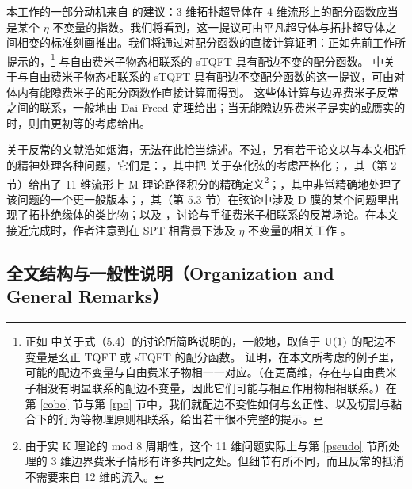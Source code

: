 本工作的一部分动机来自 \cite{KTTW} 的建议：3 维拓扑超导体在 4 维流形上的配分函数应当是某个 $\eta$ 不变量的指数。我们将看到，这一提议可由平凡超导体与拓扑超导体之间相变的标准刻画推出。我们将通过对配分函数的直接计算证明：正如先前工作所提示的，\footnote{正如 \cite{Freed} 中关于式（5.4）的讨论所简略说明的，一般地，取值于 ${\mathrm U}(1)$ 的配边不变量是幺正 TQFT 或 sTQFT 的配分函数。\cite{KTTW} 证明，在本文所考虑的例子里，可能的配边不变量与自由费米子物相一一对应。（在更高维，存在与自由费米子相没有明显联系的配边不变量，因此它们可能与相互作用物相相联系。）在第 \ref{cobo} 节与第 \ref{rpo} 节中，我们就配边不变性如何与幺正性、以及切割与黏合下的行为等物理原则相联系，给出若干很不完整的提示。} 与自由费米子物态相联系的 sTQFT 具有配边不变的配分函数。
\cite{KTTW} 中关于与自由费米子物态相联系的 sTQFT 具有配边不变配分函数的这一提议，可由对体内有能隙费米子的配分函数作直接计算而得到。
这些体计算与边界费米子反常之间的联系，一般地由 Dai-Freed 定理给出；当无能隙边界费米子是实的或赝实的时，则由更初等的考虑给出。

关于反常的文献浩如烟海，无法在此恰当综述。不过，另有若干论文以与本文相近的精神处理各种问题，它们是：\cite{Bunke}，其中把 \cite{Dinstanton} 关于杂化弦的考虑严格化；\cite{DMW}，其（第 2 节）给出了 11 维流形上 M 理论路径积分的精确定义\footnote{由于实 K 理论的 mod 8 周期性，这个 11 维问题实际上与第 \ref{pseudo} 节所处理的 3 维边界费米子情形有许多共同之处。但细节有所不同，而且反常的抵消不需要来自 12 维的流入。}；\cite{FM}，其中非常精确地处理了该问题的一个更一般版本；\cite{MW}，其（第 5.3 节）在弦论中涉及 D-膜的某个问题里出现了拓扑绝缘体的类比物；以及 \cite{Monnier}，讨论与手征费米子相联系的反常场论。在本文接近完成时，作者注意到在 SPT 相背景下涉及 $\eta$ 不变量的相关工作 \cite{Metlitski}。

\subsection{全文结构与一般性说明（Organization and General Remarks）}\label{zorg}

